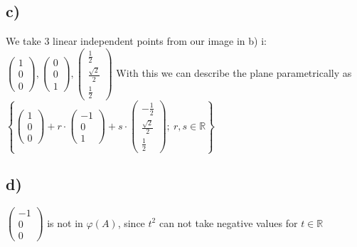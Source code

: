 \documentclass{article}
\newcommand{\R}[0]{\mathbb{R}}
\begin{document}
\subsection*{c)}
We take 3 linear independent points from our image in b) i:
$\left( \begin{array}{c}1 \\ 0 \\ 0 \end{array} \right), \left( \begin{array}{c}0 \\ 0 \\ 1 \end{array} \right), \left( \begin{array}{c} \frac{1}{2} \\ \frac{\sqrt{2}}{2} \\ \frac{1}{2} \end{array} \right)$ 
With this we can describe the plane parametrically as $\left\{ \left( \begin{array}{c}1 \\ 0 \\ 0 \end{array} \right) + r \cdot \left( \begin{array}{c}-1 \\ 0 \\ 1 \end{array} \right) + s \cdot \left( \begin{array}{c} - \frac{1}{2} \\ \frac{\sqrt{2}}{2} \\ \frac{1}{2} \end{array} \right) ;\ r,s \in \R \right\}$  
\subsection*{d)}
$\left( \begin{array}{c}-1 \\ 0 \\0 \end{array} \right)$ is not in $\varphi (A)$, since $t^2$ can not take negative values for $t \in \R$
\end{document}
